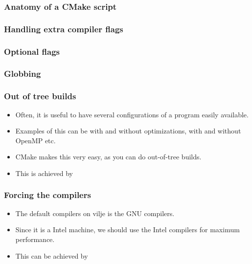 \documentclass{beamer}
\begin{document}
\begin{frame}\frametitle{Anatomy of a CMake script}

\end{frame}
\begin{frame}\frametitle{Handling extra compiler flags}

\end{frame}
\begin{frame}\frametitle{Optional flags}

\end{frame}
\begin{frame}\frametitle{Globbing}

\end{frame}
\begin{frame}\frametitle{Out of tree builds}
\begin{itemize}
  \item Often, it is useful to have several configurations of a program easily available.
  \item Examples of this can be with and without optimizations, with and without OpenMP etc.
  \item CMake makes this very easy, as you can do out-of-tree builds.
  \item This is achieved by
    
\end{itemize}
\end{frame}
\begin{frame}\frametitle{Forcing the compilers}
\begin{itemize}
  \item The default compilers on vilje is the GNU compilers.
  \item Since it is a Intel machine, we should use the Intel compilers for maximum performance.
  \item This can be achieved by
  
\end{itemize}
\end{frame}
\end{document}
